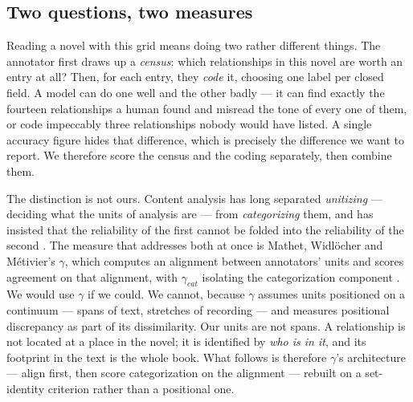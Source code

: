 \subsection{Two questions, two measures}

Reading a novel with this grid means doing two rather different things. The
annotator first draws up a \emph{census}: which relationships in this novel are
worth an entry at all? Then, for each entry, they \emph{code} it, choosing one
label per closed field. A model can do one well and the other badly --- it can
find exactly the fourteen relationships a human found and misread the tone of
every one of them, or code impeccably three relationships nobody would have
listed. A single accuracy figure hides that difference, which is precisely the
difference we want to report. We therefore score the census and the coding
separately, then combine them.

The distinction is not ours. Content analysis has long separated
\emph{unitizing} --- deciding what the units of analysis are --- from
\emph{categorizing} them, and has insisted that the reliability of the first
cannot be folded into the reliability of the second
\cite{krippendorff2013content,krippendorff2016unitizing}. The measure that
addresses both at once is Mathet, Widlöcher and Métivier's $\gamma$, which
computes an alignment between annotators' units and scores agreement on that
alignment, with $\gamma_{cat}$ isolating the categorization component
\cite{mathet2015gamma,mathet2017gammacat}. We would use $\gamma$ if we could.
We cannot, because $\gamma$ assumes units positioned on a continuum --- spans of
text, stretches of recording --- and measures positional discrepancy as part of
its dissimilarity. Our units are not spans. A relationship is not located at a
place in the novel; it is identified by \emph{who is in it}, and its footprint
in the text is the whole book. What follows is therefore $\gamma$'s
architecture --- align first, then score categorization on the alignment ---
rebuilt on a set-identity criterion rather than a positional one.


